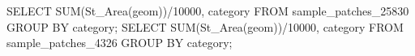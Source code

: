 \lstset{caption=Crear una función para calcular el IDW (I),label= IDW1}
\begin{SQL}
SELECT SUM(St_Area(geom))/10000, category FROM sample_patches_25830 GROUP BY category;
SELECT SUM(St_Area(geom))/10000, category FROM sample_patches_4326 GROUP BY category;
\end{SQL}
